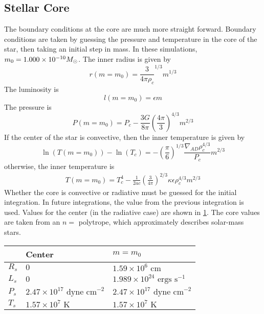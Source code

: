 \documentclass[12pt]{article}
\renewcommand{\ll}{\left} %
\newcommand{\rr}{\right} %
\newcommand{\txt}{\textrm} %
\newcommand{\unit}[1]{\txt{ #1}} %
\newcommand{\E}[1]{\times 10^{#1}} %
\begin{document}
\subsection{Stellar Core}
The boundary conditions at the core are much more straight forward. Boundary conditions are taken by guessing the pressure and temperature in the core of the star, then taking an initial step in mass. In these simulations, $m_0 = 1.000 \times 10^{-10}M_\odot$. The inner radius is given by
\begin{equation}
r(m=m_0) = \frac{3}{4\pi \rho_c}^{1/3} m^{1/3}
\end{equation}
The luminosity is
\begin{equation}
l(m=m_0) = \epsilon m
\end{equation}
The pressure is
\begin{equation}
P(m=m_0) = P_c - \frac{3 G}{8 \pi} \left(\frac{4 \pi}{3}\right)^{4/3} m^{2/3}
\end{equation}
If the center of the star is convective, then the inner temperature is given by
\begin{equation}
\ln(T(m=m_0))-\ln(T_c) = - \left( \frac{\pi}{6} \right)^{1/3} \frac{\nabla_{AD} \rho_c^{4/3}}{P_c} m^{2/3}
\end{equation}
otherwise, the inner temperature is
\begin{align}
T(m=m_0) = T_c^4 - \frac{1}{2ac} \ll(\frac{3}{4 \pi}\rr)^{2/3} \kappa \epsilon \rho_c^{4/3} m^{2/3}
\end{align}
Whether the core is convective or radiative must be guessed for the initial integration. In future integrations, the value from the previous integration is used. Values for the center (in the radiative case) are shown in \cref{tab:center}. The core values are taken from an $n=$ polytrope, which approximately describes solar-mass stars.

\begin{table}[htbp]
   \centering
   \begin{tabular}{@{} l|l|l @{}} 
   & Center & $m=m_0$ \\ \hline \hline
   $R_s$ & $0$ & $1.59\E{6} \unit{cm}$ \\
   $L_s$ & $0$ &  $1.989\E{24} \unit{ergs s}^{-1}$\\
   $P_s$ & $2.47\E{17} \unit{dyne cm}^{-2}$ & $2.47\E{17} \unit{dyne cm}^{-2}$ \\
   $T_s$ & $1.57\E{7} \unit{K}$ & $1.57\E{7} \unit{K}$
   \end{tabular}
   \label{tab:center}
\end{table}
\end{document}
